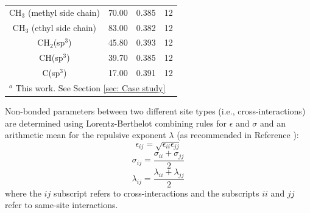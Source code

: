 \documentclass[journal=jced,manuscript=article]{achemso}
\begin{document}
\begin{table}[h!]
\begin{center}
\begin{tabular}{|c|c|c|c|}
				CH$_3$ (methyl side chain) & 70.00 & 0.385 & 12 \\
				CH$_3$ (ethyl side chain) & 83.00 & 0.382 & 12 \\
				CH$_2$(sp$^3$) & 45.80 & 0.393 & 12 \\ 
				CH(sp$^3$) & 39.70 & 0.385 & 12\\
				C(sp$^3$) & 17.00 & 0.391 & 12 \\
				\hline
				\multicolumn{4}{|l|}{$^a$ This work. See Section \ref{sec: Case study}} \\
				\hline
			\end{tabular}
		\end{center}
	\end{table}
    
    Non-bonded parameters between two different site types (i.e., cross-interactions) are determined using Lorentz-Berthelot combining rules \cite{Allen1987} for $\epsilon$ and $\sigma$ and an arithmetic mean for the repulsive exponent $\lambda$ (as recommended in Reference ):
    \begin{equation} \label{eq:Lorentz-Berthelot_eps}
    \epsilon_{ij} = \sqrt{\epsilon_{ii} \epsilon_{jj}}
    \end{equation}
    \begin{equation} \label{eq:Lorentz-Berthelot_sig}
    \sigma_{ij} = \frac{\sigma_{ii} + \sigma_{jj}}{2}
    \end{equation}
    \begin{equation} \label{eq:Lorentz-Berthelot_lam}
    \lambda_{ij} = \frac{\lambda_{ii} + \lambda_{jj}}{2}
    \end{equation}
    where the $ij$ subscript refers to cross-interactions and the subscripts $ii$ and $jj$ refer to same-site interactions. 
    
\end{document}
